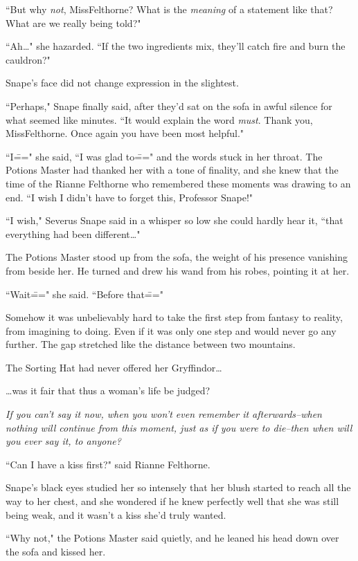 ``But why \emph{not}, Miss\?Felthorne? What is the \emph{meaning} of a statement like that? What are we really being told?"

``Ah{\ldots}" she hazarded. ``If the two ingredients mix, they'll catch fire and burn the cauldron?"

Snape's face did not change expression in the slightest.

``Perhaps," Snape finally said, after they'd sat on the sofa in awful silence for what seemed like minutes. ``It would explain the word \emph{must}. Thank you, Miss\?Felthorne. Once again you have been most helpful."

``I\===" she said, ``I was glad to\===" and the words stuck in her throat. The Potions Master had thanked her with a tone of finality, and she knew that the time of the Rianne Felthorne who remembered these moments was drawing to an end. ``I wish I didn't have to forget this, Professor Snape!"

``I wish," Severus Snape said in a whisper so low she could hardly hear it, ``that everything had been different{\ldots}"

The Potions Master stood up from the sofa, the weight of his presence vanishing from beside her. He turned and drew his wand from his robes, pointing it at her.

``Wait\===" she said. ``Before that\==="

Somehow it was unbelievably hard to take the first step from fantasy to reality, from imagining to doing. Even if it was only one step and would never go any further. The gap stretched like the distance between two mountains.

The Sorting Hat had never offered her Gryffindor{\ldots}

{\ldots}was it fair that thus a woman's life be judged?

\emph{If you can't say it now, when you won't even remember it afterwards\---when nothing will continue from this moment, just as if you were to die\---then when will you ever say it, to anyone?}

``Can I have a kiss first?" said Rianne Felthorne.

Snape's black eyes studied her so intensely that her blush started to reach all the way to her chest, and she wondered if he knew perfectly well that she was still being weak, and it wasn't a kiss she'd truly wanted.

``Why not," the Potions Master said quietly, and he leaned his head down over the sofa and kissed her.


